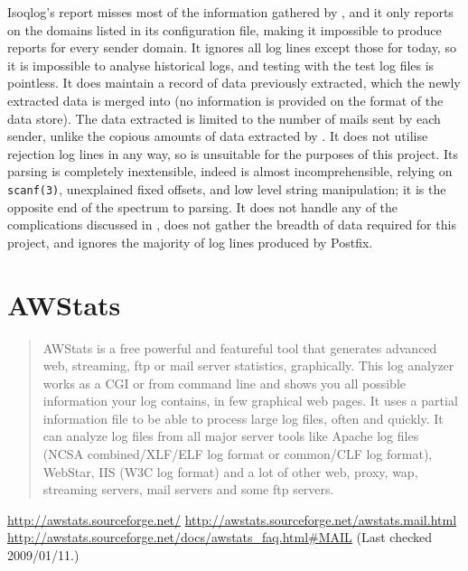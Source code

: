 Isoqlog's report misses most of the information gathered by \parsername{},
and it only reports on the domains listed in its configuration file, making
it impossible to produce reports for every sender domain.  It ignores all
log lines except those for today, so it is impossible to analyse historical
logs, and testing with the \numberOFlogFILES{} test log files is pointless.
It does maintain a record of data previously extracted, which the newly
extracted data is merged into (no information is provided on the format of
the data store).  The data extracted is limited to the number of mails sent
by each sender, unlike the copious amounts of data extracted by
\parsername{}.  It does not utilise rejection log lines in any way, so is
unsuitable for the purposes of this project.  Its parsing is completely
inextensible, indeed is almost incomprehensible, relying on
\texttt{scanf(3)}, unexplained fixed offsets, and low level string
manipulation; it is the opposite end of the spectrum to \parsernames{}
parsing.  It does not handle any of the complications discussed in
, does not gather the breadth of data required
for this project, and ignores the majority of log lines produced by
Postfix.

\section{AWStats}

\begin{quotation}

    AWStats is a free powerful and featureful tool that generates advanced
    web, streaming, ftp or mail server statistics, graphically. This log
    analyzer works as a CGI or from command line and shows you all possible
    information your log contains, in few graphical web pages. It uses a
    partial information file to be able to process large log files, often
    and quickly. It can analyze log files from all major server tools like
    Apache log files (NCSA combined/XLF/ELF log format or common/CLF log
    format), WebStar, IIS (W3C log format) and a lot of other web, proxy,
    wap, streaming servers, mail servers and some ftp servers.

\end{quotation}

\noindent{}\url{http://awstats.sourceforge.net/} \newline{}
\url{http://awstats.sourceforge.net/awstats.mail.html} \newline{}
\url{http://awstats.sourceforge.net/docs/awstats_faq.html#MAIL} \newline{}
(Last checked 2009/01/11.)


